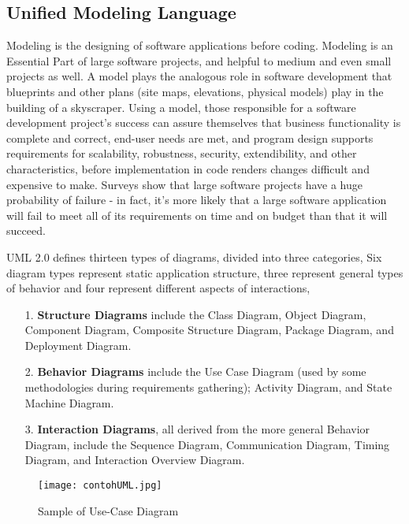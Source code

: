 \subsection{Unified Modeling Language}
Modeling is the designing of software applications before coding. Modeling is an Essential Part of large software projects, and helpful to medium and even small projects as well\cite{DefinisiUML}. A model plays the analogous role in software development that blueprints and other plans (site maps, elevations, physical models) play in the building of a skyscraper. Using a model, those responsible for a software development project's success can assure themselves that business functionality is complete and correct, end-user needs are met, and program design supports requirements for scalability, robustness, security, extendibility, and other characteristics, before implementation in code renders changes difficult and expensive to make. Surveys show that large software projects have a huge probability of failure - in fact, it's more likely that a large software application will fail to meet all of its requirements on time and on budget than that it will succeed\cite{DefinisiUML}.\par
UML 2.0 defines thirteen types of diagrams, divided into three categories, Six diagram types represent static application structure, three represent general types of behavior and four represent different aspects of interactions,
\begin{enumerate}
\setlength{\itemsep}{1.5pt}
\setlength{\parskip}{1.5pt}
\item [1.]\textbf{Structure Diagrams} include the Class Diagram, Object Diagram, Component Diagram, Composite Structure Diagram, Package Diagram, and Deployment Diagram. 
\item [2.]\textbf{Behavior Diagrams} include the Use Case Diagram (used by some methodologies during requirements gathering); Activity Diagram, and State Machine Diagram.
\item [3.]\textbf{Interaction Diagrams}, all derived from the more general Behavior Diagram, include the Sequence Diagram, Communication Diagram, Timing Diagram, and Interaction Overview Diagram.
\end{enumerate}
\begin{figure}[H]
    \begin{center}
    \texttt{[image: contohUML.jpg]}
        \caption{Sample of Use-Case Diagram \cite{SampleOfSimpleUML}}
        \label{fig:use-caseDiagram}
    \end{center}
\end{figure}

